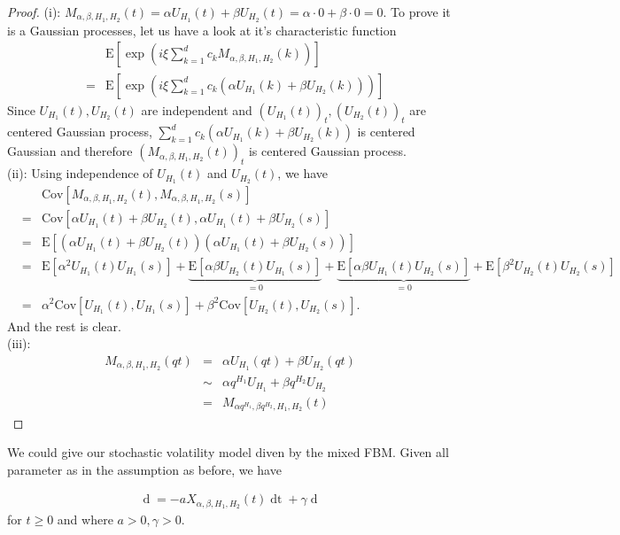 \documentclass[a4paper, twoside, 11pt]{article}
\theoremstyle{definition}
\begin{document}
\begin{proof}
  (i): $M_{\alpha,\beta,H_1,H_2}(t) = \alpha U_{H_1}(t) + \beta U_{H_2}(t) = \alpha \cdot 0 + \beta \cdot 0 = 0$.
  To prove it is a Gaussian processes, let us have a look at it's characteristic function
  \begin{eqnarray*}
	&&\mathrm{E}[\exp(i\xi\sum\limits_{k=1}^{d} c_k M_{\alpha,\beta,H_1,H_2}(k))]\\
	&=& \mathrm{E}[\exp(i\xi\sum\limits_{k=1}^{d} c_k (\alpha U_{H_1}(k) + \beta U_{H_2}(k)))]
  \end{eqnarray*}
  Since $U_{H_1}(t), U_{H_2}(t)$ are independent and $(U_{H_1}(t))_t, (U_{H_2}(t))_t$ are centered Gaussian process, $\sum\limits_{k=1}^{d} c_k (\alpha U_{H_1}(k) + \beta U_{H_2}(k))$ is centered Gaussian and therefore $(M_{\alpha,\beta,H_1,H_2}(t))_t$ is centered Gaussian process. \\
  (ii): Using independence of $U_{H_1}(t)$ and $U_{H_2}(t)$, we have
  \begin{eqnarray*}
	&&\mathrm{Cov}[M_{\alpha,\beta,H_1,H_2}(t), M_{\alpha,\beta,H_1,H_2}(s)]\\
	&=& \mathrm{Cov}[\alpha U_{H_1}(t)+\beta U_{H_2}(t), \alpha U_{H_1}(t)+\beta U_{H_2}(s)]\\
	&=& \mathrm{E}[(\alpha U_{H_1}(t)+\beta U_{H_2}(t)) (\alpha U_{H_1}(t)+\beta U_{H_2}(s))]\\
	&=& \mathrm{E}[\alpha^2U_{H_1}(t)U_{H_1}(s)] + \underbrace{\mathrm{E}[\alpha \beta U_{H_2}(t)U_{H_1}(s)]}_{=0} + \underbrace{\mathrm{E}[\alpha\beta U_{H_1}(t)U_{H_2}(s)]}_{=0} +\mathrm{E}[\beta^2 U_{H_2}(t)U_{H_2}(s)] \\
	&=& \alpha^2 \mathrm{Cov}[U_{H_1}(t), U_{H_1}(s)] + \beta^2\mathrm{Cov}[U_{H_2}(t), U_{H_2}(s)].
  \end{eqnarray*}
And the rest is clear.\\
(iii): 
\begin{eqnarray*}
  M_{\alpha,\beta,H_1,H_2}(qt) &=&  \alpha U_{H_1}(qt)+\beta U_{H_2}(qt)\\
  &\sim& \alpha q^{H_1} U_{H_1} + \beta q^{H_2} U_{H_2}\\
  &=& M_{\alpha q^{H_1}, \beta q^{H_2}, H_1, H_2}(t)
\end{eqnarray*}
\end{proof}
We could give our stochastic volatility model diven by the mixed FBM. Given all parameter as in the assumption as before, we have 

\begin{eqnarray}
  \mathop{dX_{\alpha,\beta,H_1,H_2}(t)} = -aX_{\alpha,\beta,H_1,H_2}(t)\mathop{dt} + \gamma \mathop{dM_{\alpha,\beta,H_1,H_2}(t)}
  \label{sec:wfsv}
\end{eqnarray}
for $t\ge 0$ and where $a>0, \gamma >0$.
\end{document}
